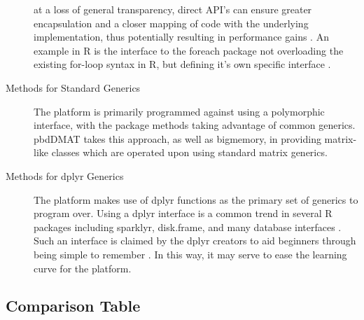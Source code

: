 \documentclass[a4paper,10pt]{article}
\begin{document}
\begin{description}
      at a loss of general transparency, direct API's can ensure
      greater encapsulation and a closer mapping of code with the
      underlying implementation, thus potentially resulting in
      performance gains \cite{bierhoff2009api}.
      An example in R is the interface to the foreach package not
      overloading the existing for-loop syntax in R, but defining it's
      own specific interface \cite{microsoft20}. 
\item[Methods for Standard Generics]
      The platform is primarily programmed against using a polymorphic
      interface, with the package methods taking advantage of common
      generics.
      pbdDMAT takes this approach, as well as bigmemory, in providing
      matrix-like classes which are operated upon using standard matrix
      generics\cite{pbdDMATpackage}\cite{kane13:bigmemory}.
\item[Methods for dplyr Generics]
      The platform makes use of dplyr functions as the primary set of
      generics to program over.
      Using a dplyr interface is a common trend in several R packages
      including sparklyr, disk.frame, and many database interfaces
      \cite{luraschi20}\cite{zj20}.
      Such an interface is claimed by the dplyr creators to aid
      beginners through being simple to remember \cite{wickham2019welcome}.
      In this way, it may serve to ease the learning curve for the platform.
\end{description}

\subsection{Comparison Table}\label{sec:comp-tab}
\end{document}
